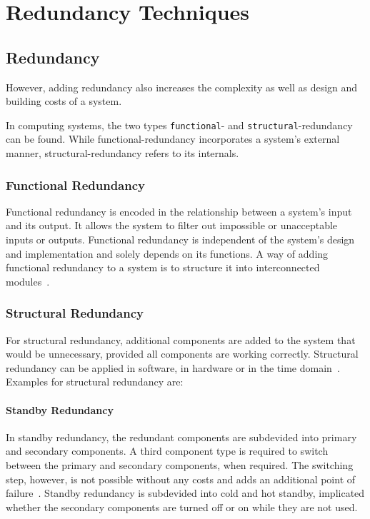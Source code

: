 \section{Redundancy Techniques}


\subsection{Redundancy}

However, adding redundancy also increases the complexity as well as design and building costs of a system.

In computing systems, the two types \texttt{functional}- and \texttt{structural}-redundancy can be found.
While functional-redundancy incorporates a system's external manner, structural-redundancy refers to its internals.

\subsubsection{Functional Redundancy}
Functional redundancy is encoded in the relationship between a system's input and its output.
It allows the system to filter out impossible or unacceptable inputs or outputs.
Functional redundancy is independent of the system's design and implementation and solely depends on its functions.
A way of adding functional redundancy to a system is to structure it into interconnected modules~\cite{GeffroyMotetDependableComputing}.

\subsubsection{Structural Redundancy}
For structural redundancy, additional components are added to the system that would be unnecessary, provided all components are working correctly.
Structural redundancy can be applied in software, in hardware or in the time domain~\cite{GeffroyMotetDependableComputing}.
Examples for structural redundancy are:

\paragraph{Standby Redundancy}
In standby redundancy, the redundant components are subdevided into primary and secondary components.
A third component type is required to switch between the primary and secondary components, when required.
The switching step, however, is not possible without any costs and adds an additional point of failure~\cite{PepperlFuchs}.
Standby redundancy is subdevided into cold and hot standby, implicated whether the secondary components are turned off or on while they are not used.

